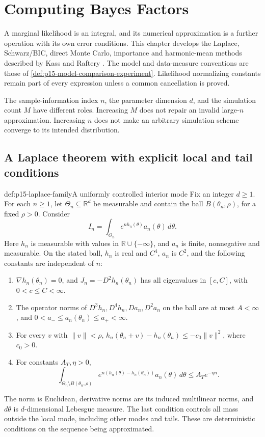 \chapter{Computing Bayes Factors}
\label{sec:p15-bayes-factor-computation}

A marginal likelihood is an integral, and its numerical approximation is
a further operation with its own error conditions. This chapter develops
the Laplace, Schwarz/BIC, direct Monte Carlo, importance and harmonic-mean
methods described by Kass and Raftery
\cite[Sec.~4, pp.~777--781]{KassRaftery1995BayesFactors}.
The model and data-measure conventions are those of
\cref{def:p15-model-comparison-experiment}. Likelihood normalizing constants
remain part of every expression unless a common cancellation is proved.

The sample-information index \(n\), the parameter dimension \(d\), and the
simulation count \(M\) have different roles. Increasing \(M\) does not repair
an invalid large-\(n\) approximation. Increasing \(n\) does not make an
arbitrary simulation scheme converge to its intended distribution.

\section{A Laplace theorem with explicit local and tail conditions}
\label{sec:p15-laplace-hypotheses}

\begin{hbdefinition}{def:p15-laplace-family}{A uniformly controlled interior mode}
Fix an integer \(d\geq1\). For each \(n\geq1\), let
\(\Theta_n\subseteq\mathbb R^d\) be measurable and contain the ball
\(B(\theta_n,\rho)\), for a fixed \(\rho>0\). Consider
\[
 I_n=\int_{\Theta_n}e^{nh_n(\theta)}a_n(\theta)\,d\theta .
\]
Here \(h_n\) is measurable with values in \(\mathbb R\cup\{-\infty\}\),
and \(a_n\) is finite, nonnegative and measurable. On the stated ball,
\(h_n\) is real and \(C^4\), \(a_n\) is \(C^2\), and the following
constants are independent of \(n\):
\begin{enumerate}
\item \(\nabla h_n(\theta_n)=0\), and
\(J_n=-D^2h_n(\theta_n)\) has all eigenvalues in \([c,C]\), with
\(0<c\leq C<\infty\).
\item The operator norms of \(D^3h_n,D^4h_n,Da_n,D^2a_n\) on the ball
are at most \(A<\infty\), and
\(0<a_-\leq a_n(\theta_n)\leq a_+<\infty\).
\item For every \(v\) with \(\|v\|<\rho\),
\(h_n(\theta_n+v)-h_n(\theta_n)\leq-c_0\|v\|^2\), where \(c_0>0\).
\item For constants \(A_T,\eta>0\),
\[
 \int_{\Theta_n\setminus B(\theta_n,\rho)}
 e^{n(h_n(\theta)-h_n(\theta_n))}a_n(\theta)\,d\theta
 \leq A_Te^{-\eta n}.
\]
\end{enumerate}
The norm is Euclidean, derivative norms are its induced multilinear norms,
and \(d\theta\) is \(d\)-dimensional Lebesgue measure. The last condition
controls all mass outside the local mode, including other modes and tails.
These are deterministic conditions on the sequence being approximated.
\end{hbdefinition}

